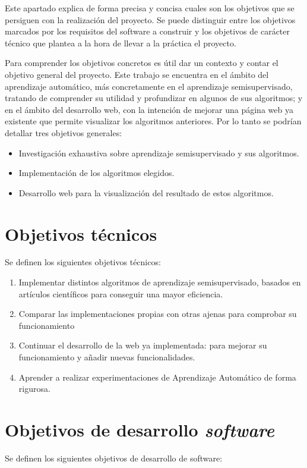 
Este apartado explica de forma precisa y concisa cuales son los objetivos que se persiguen con la realización del proyecto. Se puede distinguir entre los objetivos marcados por los requisitos del software a construir y los objetivos de carácter técnico que plantea a la hora de llevar a la práctica el proyecto.

Para comprender los objetivos concretos es útil dar un contexto y contar el objetivo general del proyecto. Este trabajo se encuentra en el ámbito del aprendizaje automático, más concretamente en el aprendizaje semisupervisado, tratando de comprender su utilidad y profundizar en algunos de sus algoritmos; y en el ámbito del desarrollo web, con la intención de mejorar una página web ya existente que permite visualizar los algoritmos anteriores. Por lo tanto se podrían detallar tres objetivos generales:
\begin{itemize}
	\item Investigación exhaustiva sobre aprendizaje semisupervisado y sus algoritmos.
	\item Implementación de los algoritmos elegidos.
	\item Desarrollo web para la visualización del resultado de estos algoritmos.
\end{itemize}

\section{Objetivos técnicos}
Se definen los siguientes objetivos técnicos:

\begin{enumerate}
	\item Implementar distintos algoritmos de aprendizaje semisupervisado, basados en artículos científicos para conseguir una mayor eficiencia.
	\item Comparar las implementaciones propias con otras ajenas para comprobar su funcionamiento
	\item Continuar el desarrollo de la web ya implementada: para mejorar su funcionamiento y añadir nuevas funcionalidades.
	\item  Aprender a realizar experimentaciones de Aprendizaje Automático de forma rigurosa.
\end{enumerate}

\section{Objetivos de desarrollo \textit{software}}
Se definen los siguientes objetivos de desarrollo de software:

